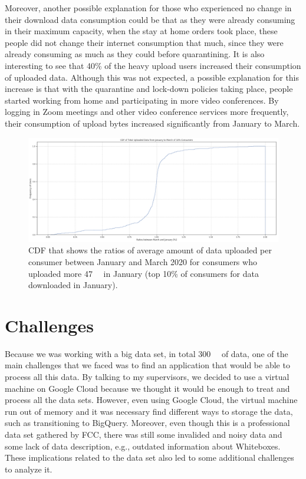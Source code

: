 \documentclass[conference,10pt]{IEEEtran}
\begin{document}
Moreover, another possible explanation for those who experienced no change in their download data consumption could be that as they were already consuming in their maximum capacity, when the stay at home orders took place, these people did not change their internet consumption that much, since they were already consuming as much as they could before quarantining. It is also interesting to see that 40\% of the heavy upload users increased their consumption of uploaded data. Although this was not expected, a possible explanation for this increase is that with the quarantine and lock-down policies taking place, people started working from home and participating in more video conferences. By logging in Zoom meetings and other video conference services more frequently, their consumption of upload bytes increased significantly from January to March.
\begin{figure}
\centering
\includegraphics[width=1.0\linewidth]{figs/heavyup.PNG}
\caption{CDF that shows the ratios of average amount of data uploaded per consumer between January and March 2020 for consumers who uploaded more \SI{47}{\giga\byte} in January (top 10\% of consumers for data downloaded in January).}
\label{fig:heavyup}
\end{figure}

\section{Challenges}
\label{sec:challenges}
Because we was working with a big data set, in total \SI{300}{\giga\byte} of data, one of the main challenges that we faced was to find an application that would be able to process all this data. By talking to my supervisors, we decided to use a virtual machine on Google Cloud because we thought it would be enough to treat and process all the data sets. However, even using Google Cloud, the virtual machine run out of memory and it was necessary find different ways to storage the data, such as transitioning to BigQuery. Moreover, even though this is a professional data set gathered by FCC, there was still some invalided and noisy data and some lack of data description, e.g., outdated information about Whiteboxes. These implications related to the data set also led to some additional challenges to analyze it.
\end{document}
